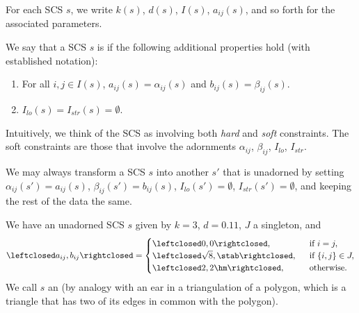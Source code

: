 For each SCS $s$, we write $k(s)$,
$d(s)$, $I(s)$, $a_{ij}(s)$, and so forth for the associated
parameters. 



%

\begin{definition}[unadorned]
We say that a SCS $s$ is  if the following additional
properties hold (with established notation):
\begin{enumerate}
\item For all $i,j\in I(s)$,  $a_{ij}(s)=\alpha_{ij}(s)$ and $b_{ij}(s)=\beta_{ij}(s)$.
\item $I_{lo}(s)=I_{str}(s)=\emptyset$.
\end{enumerate}
\end{definition}

Intuitively, we think of the SCS as involving both {\it hard} and {\it
  soft} constraints.  The soft constraints are those that involve the
adornments $\alpha_{ij}$, $\beta_{ij}$, $I_{lo}$, $I_{str}$.

\begin{example}\label{ex:extend-cs} 
We may always transform a SCS $s$ into another $s'$ that is unadorned by
setting $\alpha_{ij}(s')=a_{ij}(s)$, $\beta_{ij}(s')=b_{ij}(s)$, $I_{lo}(s')=\emptyset$, $I_{str}(s')=\emptyset$, and
keeping the rest of the data the same.
\end{example}


\begin{definition}[ear] 
We have an unadorned SCS $s$ given by
$k=3$, $d=0.11$, $J$ a singleton, 
and
\[
\leftclosed a_{ij},b_{ij}\rightclosed=
\begin{cases}
 \leftclosed0,0\rightclosed,
 &\text{~~if } i=j,\\
 \leftclosed\sqrt8,\stab\rightclosed,
 &\text{~~if } \{i,j\} \in J,\\
 \leftclosed 2,2\hm\rightclosed,
 &\text{~~otherwise. }
\end{cases}
\]
We call $s$ an  (by analogy with an ear
in a triangulation of a polygon, which is a triangle that has two of
its edges in common with the polygon).
\end{definition}


